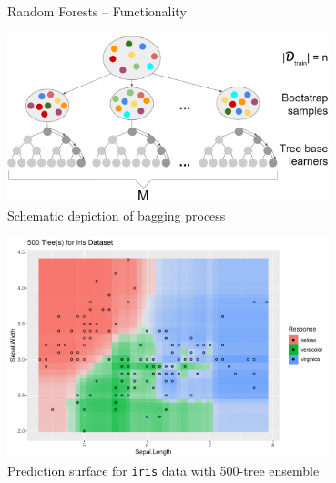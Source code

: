\begin{frame}{Random Forests -- Functionality}
\begin{minipage}[b]{0.5\textwidth}
  \centering
  \includegraphics[width=0.7\textwidth]{figure/rf-bagging} \\
  \tiny Schematic depiction of bagging process
\end{minipage}%
\begin{minipage}[b]{0.5\textwidth}
\centering
  \includegraphics[width=0.7\textwidth]{
  ../slides/forests/figure/cart_forest_intro_3} \\
  \tiny Prediction surface for \texttt{iris} data with 500-tree ensemble
\end{minipage}

\end{frame}


